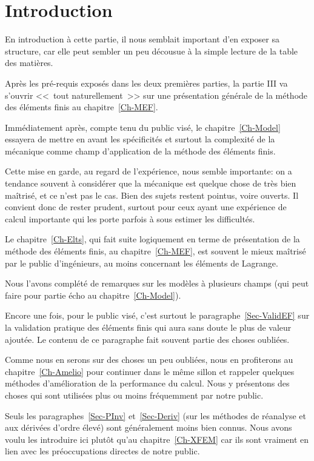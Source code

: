 \chapter*{Introduction}
En introduction à cette partie, il nous semblait important d'en exposer sa structure, car
elle peut sembler un peu décousue à la simple lecture de la table des matières.

\medskip
Après les pré-requis exposés dans les deux premières parties, la partie III va s'ouvrir
<<~tout naturellement~>> sur une présentation générale de la méthode des éléments finis au chapitre~\ref{Ch-MEF}.

\medskip
Immédiatement après, compte tenu du public visé, le chapitre~\ref{Ch-Model} essayera
de mettre en avant les spécificités et surtout la complexité de la mécanique comme champ
d'application de la méthode des éléments finis.

Cette mise en garde, au regard de l'expérience, nous semble importante:
on a tendance souvent à considérer que la mécanique est quelque chose de très bien
maîtrisé, et ce n'est pas le cas. Bien des sujets restent pointus, voire ouverts. Il convient
donc de rester prudent, surtout pour ceux ayant une expérience de calcul importante qui les
porte parfois à sous estimer les difficultés.

\medskip
Le chapitre~\ref{Ch-Elts}, qui fait suite logiquement en terme de présentation de la méthode des éléments finis, au
chapitre~\ref{Ch-MEF}, est souvent le mieux maîtrisé par le public d'ingénieurs, au moins
concernant les éléments de Lagrange.

Nous l'avons complété de remarques sur les modèles à plusieurs champs (qui peut faire pour
partie écho au chapitre~\ref{Ch-Model}).

Encore une fois, pour le public visé, c'est surtout le paragraphe~\ref{Sec-ValidEF} sur
la validation pratique des éléments finis qui aura sans doute le plus de valeur ajoutée. Le contenu
de ce paragraphe fait souvent partie des choses oubliées.

\medskip
Comme nous en serons sur des choses un peu oubliées, nous en profiterons au chapitre~\ref{Ch-Amelio}
pour continuer dans le même sillon et rappeler quelques méthodes d'amélioration de la
performance du calcul. Nous y présentons des choses qui sont utilisées plus ou moins
fréquemment par notre public.

Seuls les paragraphes~\ref{Sec-PInv} et~\ref{Sec-Deriv} (sur les méthodes de réanalyse et aux dérivées
d'ordre élevé) sont généralement moins bien connus. Nous avons voulu les introduire ici plutôt qu'au
chapitre~\ref{Ch-XFEM} car ils sont vraiment en lien avec les préoccupations directes de notre
public.

